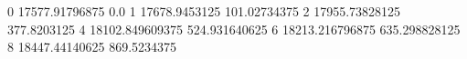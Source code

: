 0 17577.91796875 0.0
1 17678.9453125 101.02734375
2 17955.73828125 377.8203125
4 18102.849609375 524.931640625
6 18213.216796875 635.298828125
8 18447.44140625 869.5234375
